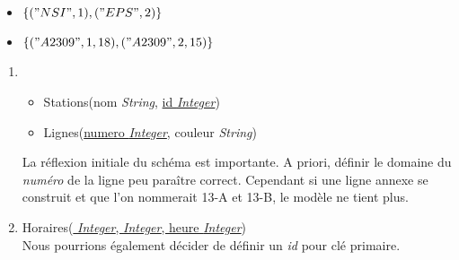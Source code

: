 \documentclass[a4paper,11pt]{article}
\begin{document}
\begin{Form}
\begin{exo}
\begin{enumerate}
\begin{itemize}
\item $\{("NSI", 1), ("EPS", 2)\}$
\item $\{("A2309", 1, 18), ("A2309", 2, 15)\}$
\end{itemize}
\end{enumerate}
\end{exo}
\begin{exo}
\begin{enumerate}
\item \begin{itemize}
\item Stations(nom \emph{String}, \underline{id \emph{Integer}})
\item Lignes(\underline{numero \emph{Integer}}, couleur \emph{String})
\end{itemize}
La réflexion initiale du schéma est importante. A priori, définir le domaine du \emph{numéro} de la ligne peu paraître correct. Cependant si une ligne annexe se construit et que l'on nommerait 13-A et 13-B, le modèle ne tient plus.
\item Horaires(\underline{ \emph{Integer},  \emph{Integer}, heure \emph{Integer}})\\
Nous pourrions également décider de définir un \emph{id} pour clé primaire.
\end{enumerate}

\end{exo}
\end{Form}
\end{document}
